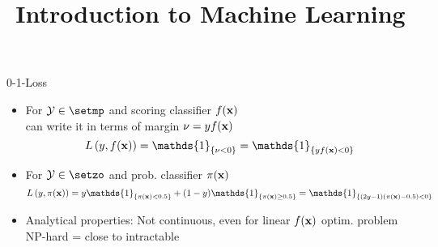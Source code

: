 \documentclass[11pt,compress,t,notes=noshow, xcolor=table]{beamer}
\title{Introduction to Machine Learning}
\begin{document}
    

\begin{frame}{0-1-Loss}

{
}

\vfill

\begin{itemize}
\item For $\Yspace \in \setmp$ and scoring classifier $f(\mathbf{x})$\\
can write it in terms of margin $\nu = yf(\mathbf{x})$
$$
\Lxy = \mathds{1}_{\{\nu < 0\}} = \mathds{1}_{\{y\fx < 0\}}
$$
\item For $\Yspace \in \setzo$ and prob. classifier $\pi(\mathbf{x})$
$$
\Lpixy = y \mathds{1}_{\{\pix < 0.5\}} + (1-y) \mathds{1}_{\{\pix \geq 0.5\}} = \mathds{1}_{\{(2y-1)(\pix - 0.5) < 0 \}} 
$$
\item Analytical properties:  Not continuous, even for linear $f(\mathbf{x})$ optim. problem NP-hard = close to intractable 
\end{itemize}
\end{frame}
\end{document}
